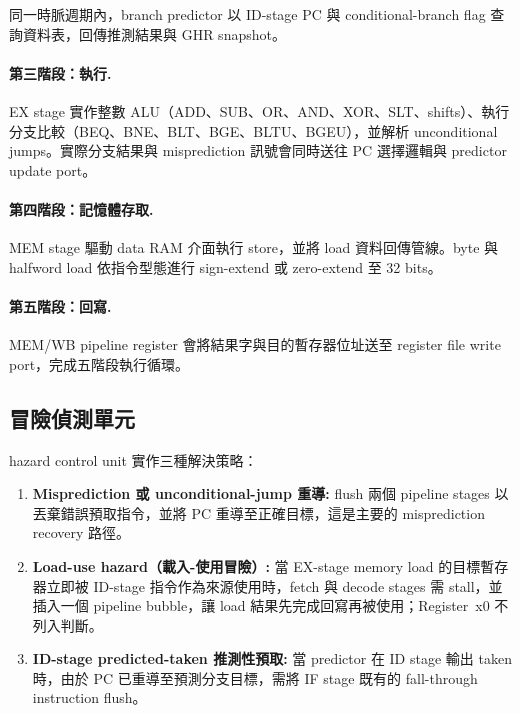 \documentclass[12pt,a4paper]{article}
\begin{document}
	同一時脈週期內，branch predictor 以 ID-stage PC 與 conditional-branch flag 查詢資料表，回傳推測結果與 GHR snapshot。

	\paragraph{第三階段：執行.}
	EX stage 實作整數 ALU（ADD、SUB、OR、AND、XOR、SLT、shifts）、執行分支比較（BEQ、BNE、BLT、BGE、BLTU、BGEU），並解析 unconditional jumps。實際分支結果與 misprediction 訊號會同時送往 PC 選擇邏輯與 predictor update port。

	\paragraph{第四階段：記憶體存取.}
	MEM stage 驅動 data RAM 介面執行 store，並將 load 資料回傳管線。byte 與 halfword load 依指令型態進行 sign-extend 或 zero-extend 至 32 bits。

	\paragraph{第五階段：回寫.}
	MEM/WB pipeline register 會將結果字與目的暫存器位址送至 register file write port，完成五階段執行循環。

	\subsection{冒險偵測單元}
	\label{sec:hazard}

	hazard control unit 實作三種解決策略：

	\begin{enumerate}
		\item \textbf{Misprediction 或 unconditional-jump 重導:}
		      flush 兩個 pipeline stages 以丟棄錯誤預取指令，並將 PC 重導至正確目標，這是主要的 misprediction recovery 路徑。

		\item \textbf{Load-use hazard（載入-使用冒險）:}
		      當 EX-stage memory load 的目標暫存器立即被 ID-stage 指令作為來源使用時，fetch 與 decode stages 需 stall，並插入一個 pipeline bubble，讓 load 結果先完成回寫再被使用；Register~x0 不列入判斷。

		\item \textbf{ID-stage predicted-taken 推測性預取:}
		      當 predictor 在 ID stage 輸出 taken 時，由於 PC 已重導至預測分支目標，需將 IF stage 既有的 fall-through instruction flush。
	\end{enumerate}
\end{document}
